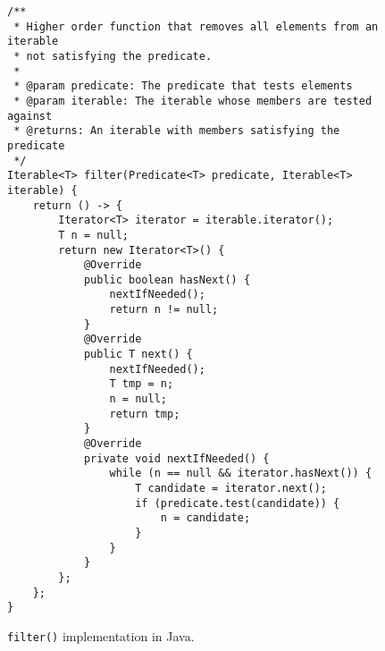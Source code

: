 \documentclass[abstracton,12pt]{scrartcl}
\theoremstyle{definition}
\begin{document}
\begin{figure}[h]
  \begin{framed}
\begin{verbatim}
/**
 * Higher order function that removes all elements from an iterable
 * not satisfying the predicate.
 *
 * @param predicate: The predicate that tests elements
 * @param iterable: The iterable whose members are tested against
 * @returns: An iterable with members satisfying the predicate
 */
Iterable<T> filter(Predicate<T> predicate, Iterable<T> iterable) {
    return () -> {
        Iterator<T> iterator = iterable.iterator();
        T n = null;
        return new Iterator<T>() {
            @Override
            public boolean hasNext() {
                nextIfNeeded();
                return n != null; 
            }
            @Override
            public T next() {
                nextIfNeeded();
                T tmp = n;
                n = null;
                return tmp;
            }
            @Override
            private void nextIfNeeded() {
                while (n == null && iterator.hasNext()) {
                    T candidate = iterator.next();
                    if (predicate.test(candidate)) {
                        n = candidate;
                    }
                }
            }
        };
    };
}
\end{verbatim}
  \end{framed}
  \caption[\texttt{filter()} implementation in Java]{\texttt{filter()} implementation in Java.}
  \label{fig:java_filter}
\end{figure}
\end{document}
